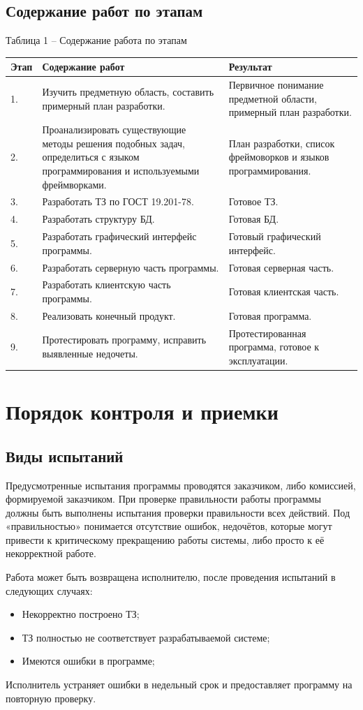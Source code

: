 \documentclass[14pt]{extarticle}
\begin{document}
\newpage

\subsection {Содержание работ по этапам}
Таблица 1 – Содержание работа по этапам

\begin{tabular}{ | p{1cm} | p{7cm} | p{7cm} | }
\hline
Этап & Содержание работ & Результат  \\ \hline
1. & Изучить предметную область, составить примерный план разработки. & Первичное понимание предметной области, примерный план разработки. \\ \hline
2. & Проанализировать существующие методы решения подобных задач, определиться с языком программирования и используемыми фреймворками. & План разработки, список фреймоворков и языков программирования. \\ \hline
3. & Разработать ТЗ по ГОСТ 19.201-78. & Готовое ТЗ. \\ \hline
4. & Разработать структуру БД. & Готовая БД. \\ \hline
5. & Разработать графический интерфейс программы. & Готовый графический интерфейс. \\ \hline
6. & Разработать серверную часть программы. & Готовая серверная часть. \\ \hline
7. & Разработать клиентскую часть программы. & Готовая клиентская часть. \\ \hline
8. & Реализовать конечный продукт. & Готовая программа. \\ \hline
9. & Протестировать программу, исправить выявленные недочеты. & Протестированная программа, готовое к эксплуатации. \\ \hline
\end{tabular}

\section{Порядок контроля и приемки}
\subsection {Виды испытаний}
Предусмотренные испытания программы проводятся заказчиком, либо комиссией, формируемой заказчиком. При проверке правильности работы программы должны быть выполнены испытания проверки правильности всех действий. Под «правильностью» понимается отсутствие ошибок, недочётов, которые могут привести к критическому прекращению работы системы, либо просто к её некорректной работе.
\par Работа может быть возвращена исполнителю, после проведения испытаний в следующих случаях:
\begin{itemize} 
    \item Некорректно построено ТЗ;
    \item ТЗ полностью не соответствует разрабатываемой системе;
    \item Имеются ошибки в программе;
\end{itemize}
\par Исполнитель устраняет ошибки в недельный срок и предоставляет программу на повторную проверку.
\end{document}
